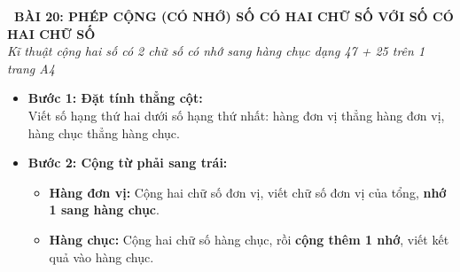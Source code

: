 \documentclass[11pt,a4paper]{article}
\begin{document}
\begin{tcolorbox}[
  enhanced,
  colback=violet!8!white,
  colframe=violet!70!black,
  arc=3mm, boxrule=1.2pt,
  left=3mm, right=3mm, top=2mm, bottom=2mm,
  halign=center
]
  {\LARGE\bfseries\color{violet!90!black}\faBookmark\ BÀI 20: PHÉP CỘNG (CÓ NHỚ) SỐ CÓ HAI CHỮ SỐ VỚI SỐ CÓ HAI CHỮ SỐ}\\[1mm]
  {\itshape\footnotesize\color{black!75} Kĩ thuật cộng hai số có 2 chữ số có nhớ sang hàng chục dạng 47 + 25 trên 1 trang A4}
\end{tcolorbox}

\vspace{-2mm}

\noindent
\begin{minipage}[t]{0.49\textwidth}\vspace{0pt}
\begin{tcolorbox}[
  enhanced,
  colback=violet!4!white,
  colframe=violet!75!black,
  arc=2mm, boxrule=0.8pt,
  left=2mm, right=2mm, top=1.8mm, bottom=1.8mm,
  title={\footnotesize\bfseries\color{white}\faKey\ 1. Quy tắc cộng 2 chữ số có nhớ}
]
{\footnotesize
\begin{itemize}\setlength{\itemsep}{1pt}\setlength{\leftskip}{-2.5mm}
  \item \textbf{Bước 1: Đặt tính thẳng cột:}\\
  Viết số hạng thứ hai dưới số hạng thứ nhất: hàng đơn vị thẳng hàng đơn vị, hàng chục thẳng hàng chục.
  \item \textbf{Bước 2: Cộng từ phải sang trái:}
  \begin{itemize}\setlength{\itemsep}{0.5pt}\setlength{\leftskip}{-2.5mm}
    \item \textbf{Hàng đơn vị:} Cộng hai chữ số đơn vị, viết chữ số đơn vị của tổng, \textbf{nhớ 1 sang hàng chục}.
    \item \textbf{Hàng chục:} Cộng hai chữ số hàng chục, rồi \textbf{cộng thêm 1 nhớ}, viết kết quả vào hàng chục.
  \end{itemize}
\end{itemize}
}
\end{tcolorbox}
\end{minipage}
\hfill
\end{document}
